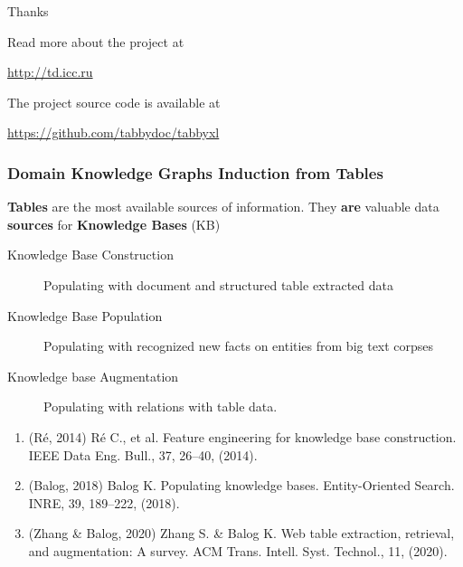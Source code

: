 \documentclass[10pt]{beamer}
\begin{document}

% 
% 

\begin{frame}
\Huge{\centerline{Thanks}}
\bigskip
\footnotesize{\centerline{Read more about the project at}}
\scriptsize{\centerline{\url{http://td.icc.ru}}}

\bigskip
\footnotesize{\centerline{The project source code is available at}}
\scriptsize{\centerline{\url{https://github.com/tabbydoc/tabbyxl}}}
\end{frame}


\begin{frame}
  \frametitle{Domain Knowledge Graphs Induction from Tables}
  \textbf{Tables} are the most available sources of information. They \textbf{are} valuable data \textbf{sources} for \textbf{Knowledge Bases} (KB)
  \begin{description}
  \item[Knowledge Base Construction] Populating with document and structured table extracted data
  \item[Knowledge Base Population] Populating with recognized new facts on entities from big text corpses
  \item[Knowledge base Augmentation] Populating with relations with table data.
  \end{description}

{\footnotesize
\begin{enumerate}
\item (Ré, 2014) Ré C., et al. Feature engineering for knowledge base construction. IEEE Data Eng. Bull., 37, 26–40, (2014).
\item    (Balog, 2018) Balog K. Populating knowledge bases. Entity-Oriented Search. INRE, 39, 189–222, (2018).
\item    (Zhang \& Balog, 2020) Zhang S. \& Balog K. Web table extraction, retrieval, and augmentation: A survey. ACM Trans. Intell. Syst. Technol., 11, (2020).
  \end{enumerate}
}
\end{frame}
\end{document}
